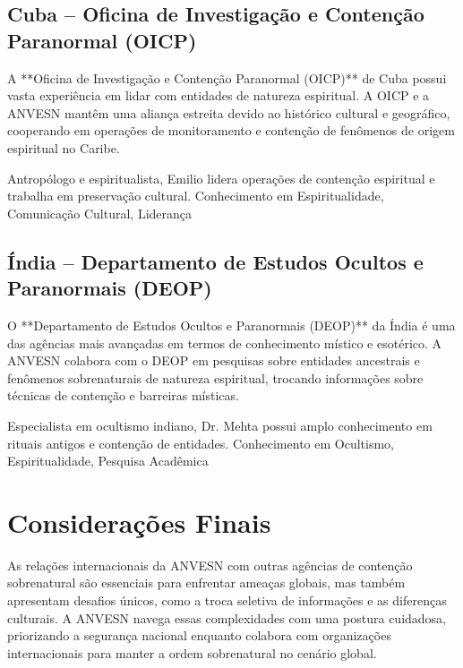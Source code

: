 \subsection{Cuba – Oficina de Investigação e Contenção Paranormal (OICP)}
A **Oficina de Investigação e Contenção Paranormal (OICP)** de Cuba possui vasta experiência em lidar com entidades de natureza espiritual. A OICP e a ANVESN mantêm uma aliança estreita devido ao histórico cultural e geográfico, cooperando em operações de monitoramento e contenção de fenômenos de origem espiritual no Caribe.

{Antropólogo e espiritualista, Emilio lidera operações de contenção espiritual e trabalha em preservação cultural.}
{Conhecimento em Espiritualidade, Comunicação Cultural, Liderança}

\subsection{Índia – Departamento de Estudos Ocultos e Paranormais (DEOP)}
O **Departamento de Estudos Ocultos e Paranormais (DEOP)** da Índia é uma das agências mais avançadas em termos de conhecimento místico e esotérico. A ANVESN colabora com o DEOP em pesquisas sobre entidades ancestrais e fenômenos sobrenaturais de natureza espiritual, trocando informações sobre técnicas de contenção e barreiras místicas.

{Especialista em ocultismo indiano, Dr. Mehta possui amplo conhecimento em rituais antigos e contenção de entidades.}
{Conhecimento em Ocultismo, Espiritualidade, Pesquisa Acadêmica}


\section{Considerações Finais}
As relações internacionais da ANVESN com outras agências de contenção sobrenatural são essenciais para enfrentar ameaças globais, mas também apresentam desafios únicos, como a troca seletiva de informações e as diferenças culturais. A ANVESN navega essas complexidades com uma postura cuidadosa, priorizando a segurança nacional enquanto colabora com organizações internacionais para manter a ordem sobrenatural no cenário global.
